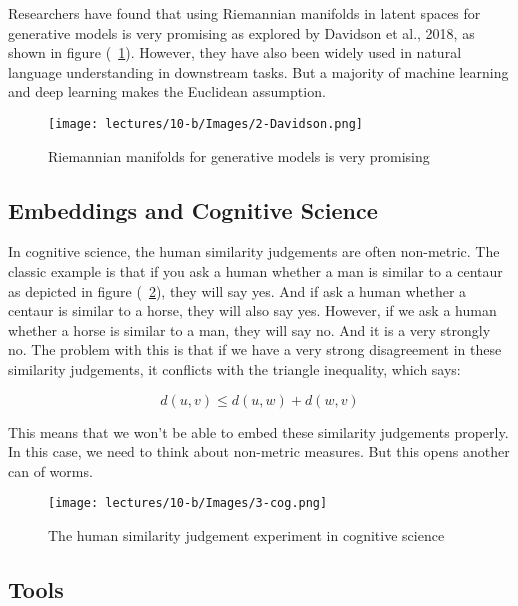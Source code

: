 Researchers have found that using Riemannian manifolds in latent spaces for generative models is very promising as explored by Davidson et al., 2018, as shown in figure (~\ref{fig:2-Davidson}). However, they have also been widely used in natural language understanding in downstream tasks. But a majority of machine learning and deep learning makes the Euclidean assumption.

\begin{figure}[htb]
  \centering
    \texttt{[image: lectures/10-b/Images/2-Davidson.png]}
    \caption{Riemannian manifolds for generative models is very promising}
    \label{fig:2-Davidson}
\end{figure}

\subsection{Embeddings and Cognitive Science}

In cognitive science, the human similarity judgements are often non-metric. The classic example is that if you ask a human whether a man is similar to a centaur as depicted in figure (~\ref{fig:3-cog}), they will say yes. And if ask a human whether a centaur is similar to a horse, they will also say yes. However, if we ask a human whether a horse is similar to a man, they will say no. And it is a very strongly no. The problem with this is that if we have a very strong disagreement in these similarity judgements, it conflicts with the triangle inequality, which says: 

\begin{equation} \label{eq:triangleIne}
    d(u,v) \leq d(u, w) + d(w, v)
\end{equation}

This means that we won't be able to embed these similarity judgements properly. In this case, we need to think about non-metric measures. But this opens another can of worms.

\begin{figure}[htb]
  \centering
    \texttt{[image: lectures/10-b/Images/3-cog.png]}
    \caption{The human similarity judgement experiment in cognitive science}
    \label{fig:3-cog}
\end{figure}

\subsection{Tools}


